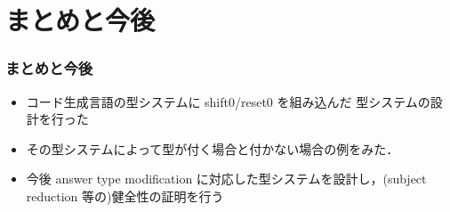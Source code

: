 \documentclass[dvipdfmx,cjk,xcolor=dvipsnames,envcountsect,notheorems,12pt]{beamer}
\newcommand\cfun[2]{\underline{\lambda}{#1}.{#2}}
\newcommand\cResetz{\underline{\textbf{reset0}}}
\newcommand\cShiftz{\underline{\textbf{shift0}}}
\newcommand\cThrow{\underline{\textbf{throw}}}
\newcommand\cresetz[1]{\cResetz~{#1}}
\newcommand\cshiftz[2]{\cShiftz~{#1}\to{#2}}
\newcommand\cthrow[2]{\cThrow~{#1}~{#2}}
\newcommand\cLet{\underline{\textbf{clet}}}
\newcommand\cIn{\underline{\textbf{in}}}
\newcommand\clet[3]{\cLet~{#1}={#2}~\cIn~{#3}}
\newcommand\codeT[2]{\langle{#1}\rangle^{#2}}
\newcommand\contT[2]{({#1} \Rightarrow {#2})}
\newcommand\ord{\ge}
\theoremstyle{definition}
\begin{document}





\section{まとめと今後}
\begin{frame}
  \frametitle{まとめと今後}
  \begin{itemize}
  \item コード生成言語の型システムに shift0/reset0 を組み込んだ 型システムの設計を行った
  \item その型システムによって型が付く場合と付かない場合の例をみた．
  \item 今後 answer type modification に対応した型システムを設計し，(subject reduction 等の)健全性の証明を行う
  \end{itemize}
\end{frame}
\end{document}
